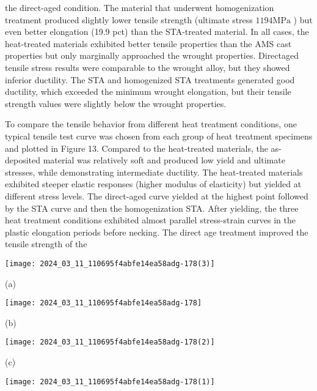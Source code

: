 \documentclass[10pt]{article}
\begin{document}
the direct-aged condition. The material that underwent homogenization treatment produced slightly lower tensile strength (ultimate stress $1194 \mathrm{MPa}$ ) but even better elongation (19.9 pct) than the STA-treated material. In all cases, the heat-treated materials exhibited better tensile properties than the AMS cast properties but only marginally approached the wrought properties. Directaged tensile stress results were comparable to the wrought alloy, but they showed inferior ductility. The STA and homogenized STA treatments generated good ductility, which exceeded the minimum wrought elongation, but their tensile strength values were slightly below the wrought properties.

To compare the tensile behavior from different heat treatment conditions, one typical tensile test curve was chosen from each group of heat treatment specimens and plotted in Figure 13. Compared to the heat-treated materials, the as-deposited material was relatively soft and produced low yield and ultimate stresses, while demonstrating intermediate ductility. The heat-treated materials exhibited steeper elastic responses (higher modulus of elasticity) but yielded at different stress levels. The direct-aged curve yielded at the highest point followed by the STA curve and then the homogenization STA. After yielding, the three heat treatment conditions exhibited almost parallel stress-strain curves in the plastic elongation periods before necking. The direct age treatment improved the tensile strength of the

\begin{center}
\texttt{[image: 2024\_03\_11\_110695f4abfe14ea58adg-178(3)]}
\end{center}

(a)

\begin{center}
\texttt{[image: 2024\_03\_11\_110695f4abfe14ea58adg-178]}
\end{center}

(b)

\begin{center}
\texttt{[image: 2024\_03\_11\_110695f4abfe14ea58adg-178(2)]}
\end{center}

(c)

\begin{center}
\texttt{[image: 2024\_03\_11\_110695f4abfe14ea58adg-178(1)]}
\end{center}
\end{document}
